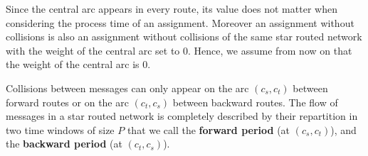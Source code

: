 \documentclass[10pt, conference, letterpaper]{IEEEtran}
\begin{document}
      Since the central arc appears in every route, its value does not matter when considering the process time of an assignment.
      Moreover an assignment without collisions is also an assignment without collisions of the same star routed network with the weight of the central arc set to $0$. Hence, we assume from now on that the weight of the central arc is $0$.
      
      
      Collisions between messages can only appear on the arc $(c_s,c_t)$ between forward routes or on the arc $(c_t,c_s)$
      between backward routes. The flow of messages in a star routed network is completely described by their repartition in two time windows of size $P$ that we call the {\bf forward period} (at $(c_s,c_t)$), and the {\bf backward period} (at $(c_t,c_s)$).

%      
%
%      
%
%
%  
%          
%
%
%
%
%  
\end{document}
